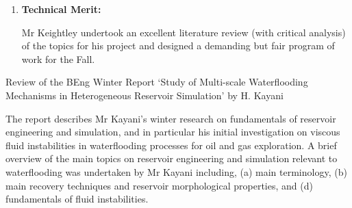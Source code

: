 \documentclass[14pt,twoside]{report}
\begin{document}
\begin{enumerate}
\begin{enumerate}
                   The literature review undertaken in this report was very thorough {\it wrt} PSO, but very limited on the energy integration part.
                   \item The work plan is appropriate for the project and seems realistic.
                \end{enumerate}
%
    \item {\bf Technical Merit:}

                    Mr Keightley undertook an excellent literature review (with critical analysis) of the topics for his project and designed a demanding but fair program of work for the Fall. 
%
\end{enumerate}

\clearpage




\bigskip

\begin{center}
  {\Large Review of the BEng Winter Report `Study of Multi-scale Waterflooding Mechanisms in Heterogeneous Reservoir Simulation' by H. Kayani}
\end{center}

The report describes Mr Kayani's winter research on fundamentals of reservoir engineering and simulation, and in particular his initial investigation on viscous fluid instabilities in waterflooding processes for oil and gas exploration. A brief overview of the main topics on reservoir engineering and simulation relevant to waterflooding was undertaken by Mr Kayani  including, (a) main terminology, (b) main recovery techniques and reservoir morphological properties, and (d) fundamentals of fluid instabilities.   
\end{document}
